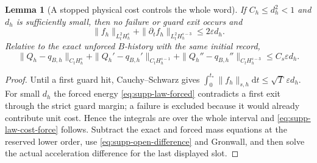 \documentclass[11pt]{article}
\newtheorem{lemma}[lemma]{Lemma}
\theoremstyle{definition}
\theoremstyle{remark}
\newcommand{\dd}{\mathrm d}
\begin{document}
\begin{lemma}[A stopped physical cost controls the whole word]
\label{lem:supp-law-cost-control}
If $C_h\le d_h^2<1$ and $d_h$ is sufficiently small, then no failure or guard
exit occurs and
\begin{equation}
 \|f_h\|_{L_t^2H_h^s}+\|\partial_tf_h\|_{L_t^2H_h^{s-3}}
       \le2\varepsilon d_h.
 \label{eq:supp-law-cost-force}
\end{equation}
Relative to the exact unforced $B$-history with the same initial record,
\begin{equation}
 \|Q_h-q_{B,h}\|_{C_tH_h^s}
 +\|Q_h'-q_{B,h}'\|_{C_tH_h^{s-1}}
 +\|Q_h''-q_{B,h}''\|_{C_tH_h^{s-3}}
 \le C_s\varepsilon d_h.
 \label{eq:supp-law-cost-shadow}
\end{equation}
\end{lemma}
\begin{proof}
Until a first guard hit, Cauchy--Schwarz gives
$\int_0^{t_*}\|f_h\|_{s,h}\dd t\le\sqrt T\,\varepsilon d_h$.
For small $d_h$ the forced energy \eqref{eq:supp-law-forced} contradicts a
first exit through the strict guard margin; a failure is excluded because it
would already contribute unit cost.  Hence the integrals are over the whole
interval and \eqref{eq:supp-law-cost-force} follows.  Subtract the exact and
forced mass equations at the reserved lower order, use
\eqref{eq:supp-open-difference} and Gronwall, and then solve the actual
acceleration difference for the last displayed slot.
\end{proof}
\end{document}
